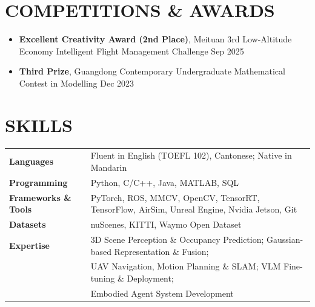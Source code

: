 \documentclass[11pt,a4paper,roman]{moderncv}
\begin{document}
\section{COMPETITIONS \& AWARDS}

\begin{minipage}{\maincolumnwidth}
  \begin{itemize}
    \item \textbf{Excellent Creativity Award (2nd Place)}, Meituan 3rd Low-Altitude Economy Intelligent Flight Management Challenge \hfill Sep 2025
    \vspace{1mm}
    \item \textbf{Third Prize}, Guangdong Contemporary Undergraduate Mathematical Contest in Modelling \hfill Dec 2023
  \end{itemize}
\end{minipage}

\section{SKILLS}

\begin{tabular}{ @{} >{\bfseries}l @{\hspace{4ex}} l }
  Languages           & Fluent in English (TOEFL 102), Cantonese; Native in Mandarin \\
  Programming         & Python, C/C++, Java, MATLAB, SQL \\
  Frameworks \& Tools & PyTorch, ROS, MMCV, OpenCV, TensorRT, TensorFlow, AirSim, Unreal Engine, Nvidia Jetson, Git \\
  Datasets            & nuScenes, KITTI, Waymo Open Dataset \\
  Expertise           & 3D Scene Perception \& Occupancy Prediction; Gaussian-based Representation \& Fusion; \\
                      & UAV Navigation, Motion Planning \& SLAM; VLM Fine-tuning \& Deployment; \\
                      & Embodied Agent System Development \\
\end{tabular}

\cfoot{\vspace{-2mm}{\color{gray} \rule[-10pt]{14.3cm}{0.05em}} \vspace{2mm}\\ \emph{\textcolor{gray}{Last Updated: March 2026}}}
\end{document}
